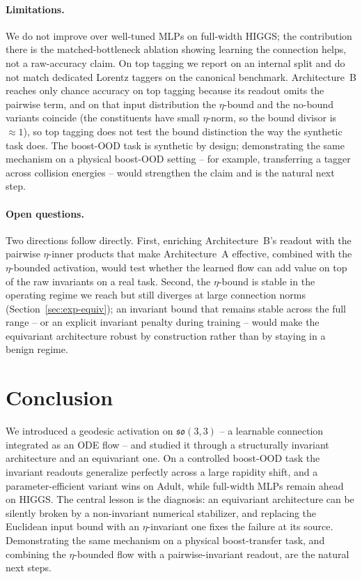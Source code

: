 \documentclass[11pt]{article}
\begin{document}
\paragraph{Limitations.}
We do not improve over well-tuned MLPs on full-width HIGGS; the
contribution there is the matched-bottleneck ablation showing learning
the connection helps, not a raw-accuracy claim. On top tagging we
report on an internal split and do not match dedicated Lorentz
taggers on the canonical benchmark. Architecture~B reaches only chance
accuracy on top tagging because its readout omits the pairwise term,
and on that input distribution the $\eta$-bound and the no-bound
variants coincide (the constituents have small $\eta$-norm, so the
bound divisor is $\approx 1$), so top tagging does not test the bound
distinction the way the synthetic task does. The boost-OOD task is
synthetic by design; demonstrating the same mechanism on a physical
boost-OOD setting -- for example, transferring a tagger across
collision energies -- would strengthen the claim and is the natural
next step.

\paragraph{Open questions.}
Two directions follow directly. First, enriching Architecture~B's
readout with the pairwise $\eta$-inner products that make
Architecture~A effective, combined with the $\eta$-bounded activation,
would test whether the learned flow can add value on top of the raw
invariants on a real task. Second, the $\eta$-bound is stable in the
operating regime we reach but still diverges at large connection norms
(Section~\ref{sec:exp-equiv}); an invariant bound that remains stable
across the full range -- or an explicit invariant penalty during
training -- would make the equivariant architecture robust by
construction rather than by staying in a benign regime.

\section{Conclusion}
\label{sec:conclusion}

We introduced a geodesic activation on $\mathfrak{so}(3,3)$ -- a
learnable connection integrated as an ODE flow -- and studied it through
a structurally invariant architecture and an equivariant one. On a
controlled boost-OOD task the invariant readouts generalize perfectly
across a large rapidity shift, and a parameter-efficient variant wins on
Adult, while full-width MLPs remain ahead on HIGGS. The central lesson
is the diagnosis: an equivariant architecture can be silently broken by
a non-invariant numerical stabilizer, and replacing the Euclidean input
bound with an $\eta$-invariant one fixes the failure at its source.
Demonstrating the same mechanism on a physical boost-transfer task, and
combining the $\eta$-bounded flow with a pairwise-invariant readout, are
the natural next steps.
\end{document}
